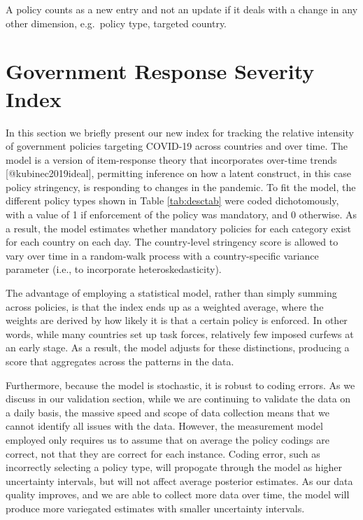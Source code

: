 \documentclass[]{article}
\begin{document}
A policy counts as a new entry and not an update if it deals with a change in any other dimension, e.g.~policy type, targeted country.

\hypertarget{government-response-severity-index}{%
\section{Government Response Severity Index}\label{government-response-severity-index}}

In this section we briefly present our new index for tracking the relative intensity of government policies targeting COVID-19 across countries and over time. The model is a version of item-response theory that incorporates over-time trends {[}@kubinec2019ideal{]}, permitting inference on how a latent construct, in this case policy stringency, is responding to changes in the pandemic. To fit the model, the different policy types shown in Table \ref{tab:desctab} were coded dichotomously, with a value of 1 if enforcement of the policy was mandatory, and 0 otherwise. As a result, the model estimates whether mandatory policies for each category exist for each country on each day. The country-level stringency score is allowed to vary over time in a random-walk process with a country-specific variance parameter (i.e., to incorporate heteroskedasticity).

The advantage of employing a statistical model, rather than simply summing across policies, is that the index ends up as a weighted average, where the weights are derived by how likely it is that a certain policy is enforced. In other words, while many countries set up task forces, relatively few imposed curfews at an early stage. As a result, the model adjusts for these distinctions, producing a score that aggregates across the patterns in the data.

Furthermore, because the model is stochastic, it is robust to coding errors. As we discuss in our validation section, while we are continuing to validate the data on a daily basis, the massive speed and scope of data collection means that we cannot identify all issues with the data. However, the measurement model employed only requires us to assume that on average the policy codings are correct, not that they are correct for each instance. Coding error, such as incorrectly selecting a policy type, will propogate through the model as higher uncertainty intervals, but will not affect average posterior estimates. As our data quality improves, and we are able to collect more data over time, the model will produce more variegated estimates with smaller uncertainty intervals.
\end{document}
